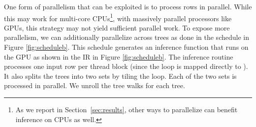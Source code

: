 One form of parallelism that can be exploited is to process rows in 
parallel. 
While this may work for multi-core CPUs\footnote{As we report in Section~\ref{sec:results}, 
other ways to parallelize can benefit inference on CPUs as well.}, with massively parallel processors like GPUs,
 this strategy may not yield sufficient parallel work. To expose more parallelism, 
we can additionally parallelize across trees as done in the schedule in Figure \ref{fig:scheduleb}. 
This schedule generates an inference function that runs on the GPU as shown in 
the IR in Figure \ref{fig:scheduleb}. 
The inference routine processes one input row per thread block (since the 
loop is mapped directly to ).
It also splits the trees into two sets by tiling the  loop.
Each of the two sets is processed in parallel. We unroll the tree walks 
for each tree.


